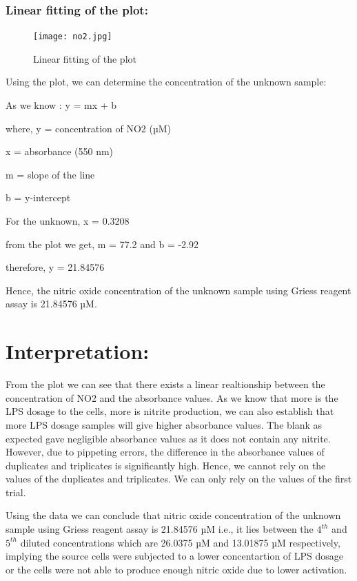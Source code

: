 \documentclass{report}
\begin{document}
 \vspace{1cm}

\subsubsection*{Linear fitting of the plot:}
\begin{figure}[htbp] 
  \centering 
  \texttt{[image: no2.jpg]} 
  \caption{Linear fitting of the plot}
  \label{fig: Linear fitting} 
\end{figure}



Using the plot, we can determine the concentration of the unknown sample:

As we know : y = mx + b

where, y = concentration of NO2 (µM)

x = absorbance (550 nm)

m = slope of the line

b = y-intercept

For the unknown, 
x = 0.3208 

from the plot we get, m = 77.2 and b = -2.92

therefore, y = 21.84576 

Hence, the nitric oxide concentration of the unknown sample using Griess reagent assay is 21.84576 µM.

 \vspace{2cm}




\section*{Interpretation:}
From the plot we can see that there exists a linear realtionship between the concentration of NO2 and the absorbance values.
As we know that more is the LPS dosage to the cells, more is nitrite production, we can also establish that more LPS dosage samples will give higher absorbance values.
The blank as expected gave negligible absorbance values as it does not contain any nitrite.
However, due to pippeting errors, the difference in the absorbance values of duplicates and triplicates is significantly high. Hence, we 
cannot rely on the values of the duplicates and triplicates. We can only rely on the values of the first trial.

Using the data we can conclude that nitric oxide concentration of the unknown sample using Griess reagent assay is 21.84576 µM
i.e., it lies between the $4^{th}$ and $5^{th}$ diluted concentrations which are 26.0375 µM and 13.01875 µM respectively, 
implying the source cells were subjected to a lower concentartion of LPS dosage or the cells were not able to produce enough nitric oxide due 
to lower activation.
\end{document}
